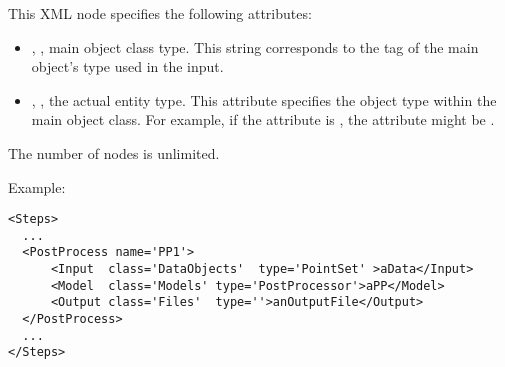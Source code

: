 \begin{itemize}
  This XML node specifies the following attributes:
\begin{itemize}
  \item {}, , main object class
    type.
    This string corresponds to the tag of the main object's type used in the
    input.
  \item {}, , the actual entity
    type.
    This attribute specifies the object type within the main object class.
    For example, if the   attribute is , the
     attribute might be .
\end{itemize}
\nb The number of  nodes is unlimited.
\end{itemize}

Example:
\begin{lstlisting}[style=XML,morekeywords={class}]
<Steps>
  ...
  <PostProcess name='PP1'>
      <Input  class='DataObjects'  type='PointSet' >aData</Input>
      <Model  class='Models' type='PostProcessor'>aPP</Model>
      <Output class='Files'  type=''>anOutputFile</Output>
  </PostProcess>
  ...
</Steps>
\end{lstlisting}
